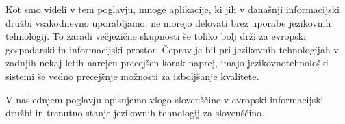 \begin{multicols}{2}
Kot smo videli v tem poglavju, mnoge aplikacije, ki jih v današnji informacij\-ski družbi vsakodnevno uporab\-ljamo, ne morejo delovati brez uporabe jezikovnih tehnologij. To zaradi večjezične skupnosti še toliko bolj drži za evropski gospodarski in informacij\-ski prostor. Čeprav je bil pri jezikovnih tehnologijah v zadnjih nekaj letih narejen precejšen korak naprej, imajo jezikovnotehnološki sistemi še vedno precejšnje možnosti za izboljšanje kvalitete. 

V naslednjem poglavju opisujemo vlogo slovenščine v evropski informacij\-ski družbi in trenutno stanje jezikovnih tehnologij za slovenščino.
\end{multicols}

\clearpage



